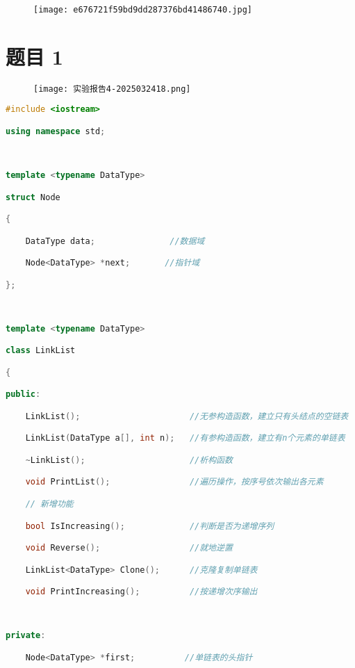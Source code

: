 \begin{figure}[H]
\centering
\texttt{[image: e676721f59bd9dd287376bd41486740.jpg]}
\label{}
\end{figure}

\section{题目 1}

\begin{figure}[H]
\centering
\texttt{[image: 实验报告4-2025032418.png]}
\label{}
\end{figure}

\begin{lstlisting}[language=C++]
#include <iostream>

using namespace std;

  

template <typename DataType>

struct Node

{

    DataType data;               //数据域

    Node<DataType> *next;       //指针域

};

  

template <typename DataType>

class LinkList

{

public:

    LinkList();                      //无参构造函数，建立只有头结点的空链表

    LinkList(DataType a[], int n);   //有参构造函数，建立有n个元素的单链表

    ~LinkList();                     //析构函数

    void PrintList();                //遍历操作，按序号依次输出各元素

    // 新增功能

    bool IsIncreasing();             //判断是否为递增序列

    void Reverse();                  //就地逆置

    LinkList<DataType> Clone();      //克隆复制单链表

    void PrintIncreasing();          //按递增次序输出

  

private:

    Node<DataType> *first;          //单链表的头指针


\end{lstlisting}
